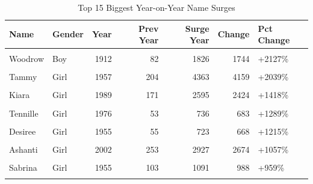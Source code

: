 \documentclass[
]{article}
\begin{document}
\begin{longtable}[t]{llrrrrl}
\caption{\label{tab:surges-table}Top 15 Biggest Year-on-Year Name Surges}\\
\toprule
Name & Gender & Year & Prev Year & Surge Year & Change & Pct Change\\
\midrule
\cellcolor{gray!10}{Marquita} & \cellcolor{gray!10}{Girl} & \cellcolor{gray!10}{1983} & \cellcolor{gray!10}{96} & \cellcolor{gray!10}{2522} & \cellcolor{gray!10}{2426} & \cellcolor{gray!10}{+2527\%}\\
Woodrow & Boy & 1912 & 82 & 1826 & 1744 & +2127\%\\
\cellcolor{gray!10}{Nevaeh} & \cellcolor{gray!10}{Girl} & \cellcolor{gray!10}{2001} & \cellcolor{gray!10}{53} & \cellcolor{gray!10}{1179} & \cellcolor{gray!10}{1126} & \cellcolor{gray!10}{+2125\%}\\
Tammy & Girl & 1957 & 204 & 4363 & 4159 & +2039\%\\
\cellcolor{gray!10}{Devante} & \cellcolor{gray!10}{Boy} & \cellcolor{gray!10}{1992} & \cellcolor{gray!10}{86} & \cellcolor{gray!10}{1551} & \cellcolor{gray!10}{1465} & \cellcolor{gray!10}{+1703\%}\\
\addlinespace
Kiara & Girl & 1989 & 171 & 2595 & 2424 & +1418\%\\
\cellcolor{gray!10}{Jayceon} & \cellcolor{gray!10}{Boy} & \cellcolor{gray!10}{2013} & \cellcolor{gray!10}{128} & \cellcolor{gray!10}{1827} & \cellcolor{gray!10}{1699} & \cellcolor{gray!10}{+1327\%}\\
Tennille & Girl & 1976 & 53 & 736 & 683 & +1289\%\\
\cellcolor{gray!10}{Dawson} & \cellcolor{gray!10}{Boy} & \cellcolor{gray!10}{1998} & \cellcolor{gray!10}{141} & \cellcolor{gray!10}{1883} & \cellcolor{gray!10}{1742} & \cellcolor{gray!10}{+1235\%}\\
Desiree & Girl & 1955 & 55 & 723 & 668 & +1215\%\\
\addlinespace
\cellcolor{gray!10}{Brianne} & \cellcolor{gray!10}{Girl} & \cellcolor{gray!10}{1979} & \cellcolor{gray!10}{133} & \cellcolor{gray!10}{1655} & \cellcolor{gray!10}{1522} & \cellcolor{gray!10}{+1144\%}\\
Ashanti & Girl & 2002 & 253 & 2927 & 2674 & +1057\%\\
\cellcolor{gray!10}{Ashton} & \cellcolor{gray!10}{Girl} & \cellcolor{gray!10}{1986} & \cellcolor{gray!10}{83} & \cellcolor{gray!10}{916} & \cellcolor{gray!10}{833} & \cellcolor{gray!10}{+1004\%}\\
Sabrina & Girl & 1955 & 103 & 1091 & 988 & +959\%\\
\cellcolor{gray!10}{Amaya} & \cellcolor{gray!10}{Girl} & \cellcolor{gray!10}{1999} & \cellcolor{gray!10}{63} & \cellcolor{gray!10}{656} & \cellcolor{gray!10}{593} & \cellcolor{gray!10}{+941\%}\\
\bottomrule
\end{longtable}
\end{document}
